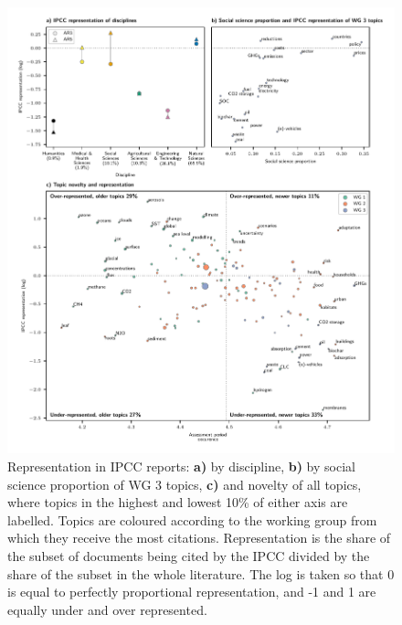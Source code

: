 \documentclass{article}
\begin{document}
\begin{linenumbers}
		\begin{figure}[htp]
			\begin{center}
				\includegraphics[width=180mm]{plots_pub/big_panel_representation.pdf}
				\caption{Representation in IPCC reports: \textbf{a)} by discipline, \textbf{b)} by social science proportion of WG 3 topics, \textbf{c)} and novelty of all topics, where topics in the highest and lowest 10\% of either axis are labelled. Topics are coloured according to the working group from which they receive the most citations. Representation is the share of the subset of documents being cited by the IPCC divided by the share of the subset in the whole literature. The log is taken so that 0 is equal to perfectly proportional representation, and -1 and 1 are equally under and over represented.}
				\label{oecd_rep}
			\end{center}
		\end{figure}
		
		

\end{linenumbers}
\end{document}
